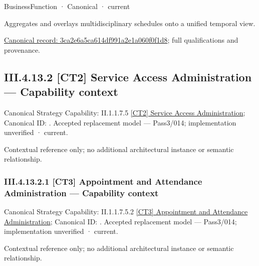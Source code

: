 \label{navigation:III.4.13.1.2.3.2.1}

\label{element:3ca2e6a5ca614df991a2e1a060f0f1d8}
{\small BusinessFunction · Canonical · current}\par

Aggregates and overlays multidisciplinary schedules onto a unified temporal view.


{\footnotesize \href{../../../../../../../continuum/business/business-function/3ca2e6a5ca614df991a2e1a060f0f1d8.md}{Canonical record: 3ca2e6a5ca614df991a2e1a060f0f1d8}; full qualifications and provenance.}\par
\subsection*{III.4.13.2 [CT2] Service Access Administration — Capability context}
\label{navigation:III.4.13.2}

{\small Canonical Strategy Capability: II.1.1.7.5 \hyperref[element:ba82c985e20a4f9382e7e265a19e440e]{[CT2] Service Access Administration}; Canonical ID: \texttt{}. Accepted replacement model — Pass3/014; implementation unverified · current.}\par
Contextual reference only; no additional architectural instance or semantic relationship.\par
\subsubsection*{III.4.13.2.1 [CT3] Appointment and Attendance Administration — Capability context}
\label{navigation:III.4.13.2.1}

{\small Canonical Strategy Capability: II.1.1.7.5.2 \hyperref[element:cd330c1c71f14310a765d0cb46e6f208]{[CT3] Appointment and Attendance Administration}; Canonical ID: \texttt{}. Accepted replacement model — Pass3/014; implementation unverified · current.}\par
Contextual reference only; no additional architectural instance or semantic relationship.\par
